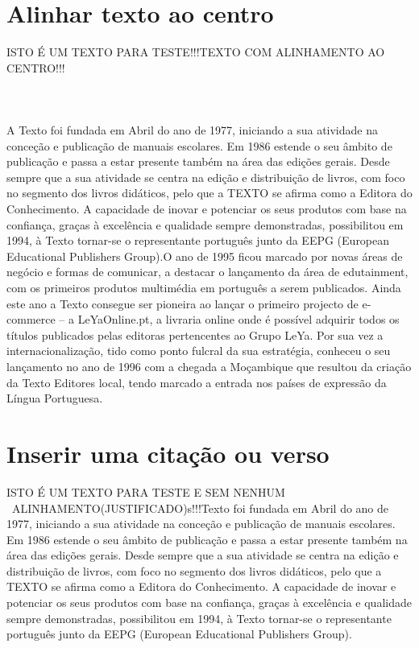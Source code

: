 \documentclass[a4paper,11pt]{report}%
\begin{document}
\section{Alinhar texto ao centro}
\begin{center}
ISTO É UM TEXTO PARA TESTE!!!\newline TEXTO COM ALINHAMENTO AO CENTRO!!!\newline \paragraph{\ \ }
A Texto foi fundada em Abril do ano de 1977, iniciando a sua atividade na conceção e publicação de manuais escolares. Em 1986 estende o seu âmbito de publicação e passa a estar presente também na área das edições gerais. Desde sempre que a sua atividade se centra na edição e distribuição de livros, com foco no segmento dos livros didáticos, pelo que a TEXTO se afirma como a Editora do Conhecimento. A capacidade de inovar e potenciar os seus produtos com base na confiança, graças à excelência e qualidade sempre demonstradas, possibilitou em 1994, à Texto tornar-se o representante português junto da EEPG (European Educational Publishers Group).O ano de 1995 ficou marcado por novas áreas de negócio e formas de comunicar, a destacar o lançamento da área de edutainment, com os primeiros produtos multimédia em português a serem publicados. Ainda este ano a Texto consegue ser pioneira ao lançar o primeiro projecto de e-commerce – a LeYaOnline.pt, a livraria online onde é possível adquirir todos os títulos publicados pelas editoras pertencentes ao Grupo LeYa. Por sua vez a internacionalização, tido como ponto fulcral da sua estratégia, conheceu o seu lançamento no ano de 1996 com a chegada a Moçambique que resultou da criação da Texto Editores local, tendo marcado a entrada nos países de expressão da Língua Portuguesa.
\end{center}


\newpage
\section{Inserir uma citação ou verso}
ISTO É UM TEXTO PARA TESTE E SEM NENHUM \ ALINHAMENTO(JUSTIFICADO)s!!!\newline  Texto foi fundada em Abril do ano de 1977, iniciando a sua atividade na conceção e publicação de manuais escolares. Em 1986 estende o seu âmbito de publicação e passa a estar presente também na área das edições gerais. Desde sempre que a sua atividade se centra na edição e distribuição de livros, com foco no segmento dos livros didáticos, pelo que a TEXTO se afirma como a Editora do Conhecimento. A capacidade de inovar e potenciar os seus produtos com base na confiança, graças à excelência e qualidade sempre demonstradas, possibilitou em 1994, à Texto tornar-se o representante português junto da EEPG (European Educational Publishers Group).
\end{document}
